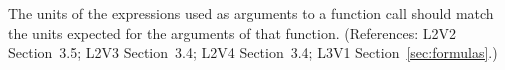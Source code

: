 The units of the expressions used as arguments to a function call
should match the units expected for the arguments of that function.
(References: L2V2 Section~3.5; L2V3 Section~3.4; L2V4 Section~3.4; 
L3V1 Section~\ref{sec:formulas}.)
